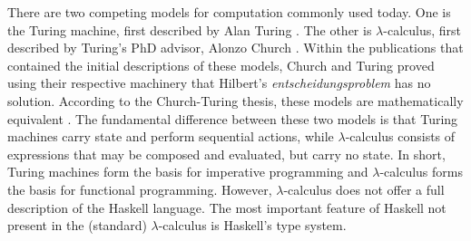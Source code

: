 \documentclass[MS, xcolor=dvipsnames]{wfuthesis}
\theoremstyle{definition}
\begin{document}
There are two competing models for computation commonly used today. One is the Turing machine, first described by Alan Turing \cite{Turing1937}. The other is $\lambda$-calculus, first described by Turing's PhD advisor, Alonzo Church \cite{Church1936}. Within the publications that contained the initial descriptions of these models, Church and Turing proved using their respective machinery that Hilbert's \emph{entscheidungsproblem} has no solution. According to the Church-Turing thesis, these models are mathematically equivalent \cite{Kleene1952}. The fundamental difference between these two models is that Turing machines carry state and perform sequential actions, while $\lambda$-calculus consists of expressions that may be composed and evaluated, but carry no state. In short, Turing machines form the basis for imperative programming and $\lambda$-calculus forms the basis for functional programming. However, $\lambda$-calculus does not offer a full description of the Haskell language. The most important feature of Haskell not present in the (standard) $\lambda$-calculus is Haskell's type system.

\end{document}
